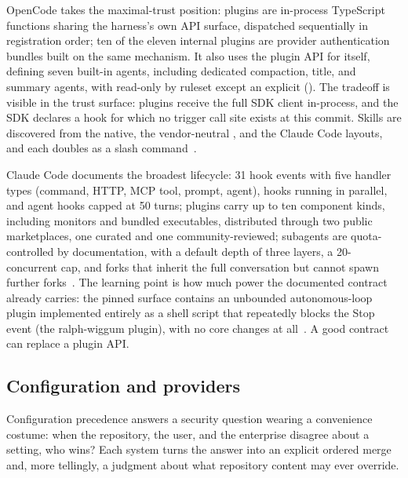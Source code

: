 \documentclass{article}
\newcommand{\occ}[0]{OpenCode}
\newcommand{\ccc}[0]{Claude Code}
\begin{document}
\occ{} takes the maximal-trust position: plugins are in-process
TypeScript functions sharing the harness's own API surface, dispatched
sequentially in registration order; ten of the eleven internal plugins
are provider authentication bundles built on the same mechanism. It also
uses the plugin API for itself, defining seven built-in agents, including
dedicated compaction, title, and summary agents, with 
read-only by ruleset except an explicit 
(). The tradeoff is visible in the trust surface:
plugins receive the full SDK client in-process, and the SDK declares a
 hook for which no trigger call site exists at this
commit. Skills are discovered from the native, the vendor-neutral
, and the \ccc{}  layouts, and each doubles
as a slash command~\citep{opencodeRepo,opencodeDocs}.

\ccc{} documents the broadest lifecycle: 31 hook events with five handler
types (command, HTTP, MCP tool, prompt, agent), hooks running in
parallel, and agent hooks capped at 50 turns; plugins carry up to ten
component kinds, including monitors and bundled executables, distributed
through two public marketplaces, one curated and one community-reviewed;
subagents are quota-controlled by documentation, with a default depth of
three layers, a 20-concurrent cap, and forks that inherit the full
conversation but cannot spawn further
forks~\citep{claudeCodeHooksDocs,claudeCodePluginsDocs,%
claudeCodeSubagentsDocs}. The learning point is how much power the
documented contract already carries: the pinned surface contains an
unbounded autonomous-loop plugin implemented entirely as a shell script
that repeatedly blocks the Stop event (the ralph-wiggum plugin), with no
core changes at all~\citep{claudeCodeSurface}. A good contract can replace
a plugin API.

\subsection{Configuration and providers}
\label{sec:config}

Configuration precedence answers a security question wearing a
convenience costume: when the repository, the user, and the enterprise
disagree about a setting, who wins? Each system turns the answer into an
explicit ordered merge and, more tellingly, a judgment about what
repository content may ever override.
\end{document}
